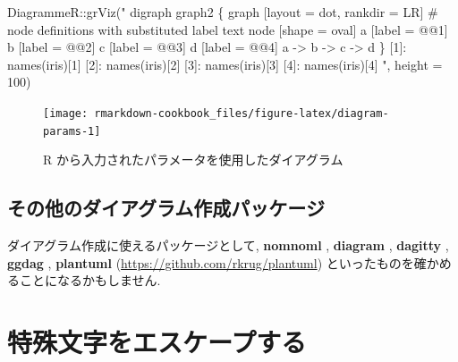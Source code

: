 \documentclass[
  11pt,
]{bxjsreport}
\newenvironment{Shaded}{\begin{snugshade}}{\end{snugshade}}
\newcommand{\AttributeTok}[1]{\textcolor[rgb]{0.77,0.63,0.00}{#1}}
\newcommand{\DecValTok}[1]{\textcolor[rgb]{0.00,0.00,0.81}{#1}}
\newcommand{\FunctionTok}[1]{\textcolor[rgb]{0.00,0.00,0.00}{#1}}
\newcommand{\NormalTok}[1]{#1}
\newcommand{\SpecialCharTok}[1]{\textcolor[rgb]{0.00,0.00,0.00}{#1}}
\newcommand{\StringTok}[1]{\textcolor[rgb]{0.31,0.60,0.02}{#1}}
\begin{document}
\begin{Shaded}
\begin{Highlighting}[numbers=left,,]
\NormalTok{DiagrammeR}\SpecialCharTok{::}\FunctionTok{grViz}\NormalTok{(}\StringTok{"}
\StringTok{  digraph graph2 \{}
\StringTok{  }
\StringTok{  graph [layout = dot, rankdir = LR]}
\StringTok{  }
\StringTok{  \# node definitions with substituted label text}
\StringTok{  node [shape = oval]}
\StringTok{  a [label = \textquotesingle{}@@1\textquotesingle{}]}
\StringTok{  b [label = \textquotesingle{}@@2\textquotesingle{}]}
\StringTok{  c [label = \textquotesingle{}@@3\textquotesingle{}]}
\StringTok{  d [label = \textquotesingle{}@@4\textquotesingle{}]}
\StringTok{  }
\StringTok{  a {-}\textgreater{} b {-}\textgreater{} c {-}\textgreater{} d}
\StringTok{  \}}
\StringTok{  }
\StringTok{  [1]: names(iris)[1]}
\StringTok{  [2]: names(iris)[2]}
\StringTok{  [3]: names(iris)[3]}
\StringTok{  [4]: names(iris)[4]}
\StringTok{  "}\NormalTok{, }
  \AttributeTok{height =} \DecValTok{100}\NormalTok{)}
\end{Highlighting}
\end{Shaded}

\begin{figure}

{\centering \texttt{[image: rmarkdown-cookbook\_files/figure-latex/diagram-params-1]} 

}

\caption{R から入力されたパラメータを使用したダイアグラム}\label{fig:diagram-params}
\end{figure}

\hypertarget{other-packages-for-making-diagrams}{%
\subsection{その他のダイアグラム作成パッケージ}\label{other-packages-for-making-diagrams}}

ダイアグラム作成に使えるパッケージとして, \textbf{nomnoml} \autocite{R-nomnoml}, \textbf{diagram} \autocite{R-diagram}, \textbf{dagitty} \autocite{R-dagitty}, \textbf{ggdag} \autocite{R-ggdag}, \textbf{plantuml} (\url{https://github.com/rkrug/plantuml}) といったものを確かめることになるかもしません.

\hypertarget{special-chars}{%
\section{特殊文字をエスケープする}\label{special-chars}}
\end{document}
